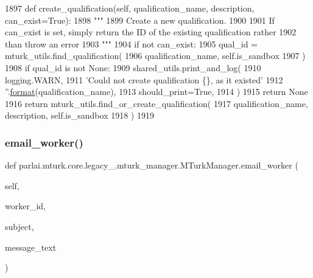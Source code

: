 \begin{DoxyCode}
1897     \textcolor{keyword}{def }create\_qualification(self, qualification\_name, description, can\_exist=True):
1898         \textcolor{stringliteral}{"""}
1899 \textcolor{stringliteral}{        Create a new qualification.}
1900 \textcolor{stringliteral}{}
1901 \textcolor{stringliteral}{        If can\_exist is set, simply return the ID of the existing qualification rather}
1902 \textcolor{stringliteral}{        than throw an error}
1903 \textcolor{stringliteral}{        """}
1904         \textcolor{keywordflow}{if} \textcolor{keywordflow}{not} can\_exist:
1905             qual\_id = mturk\_utils.find\_qualification(
1906                 qualification\_name, self.is\_sandbox
1907             )
1908             \textcolor{keywordflow}{if} qual\_id \textcolor{keywordflow}{is} \textcolor{keywordflow}{not} \textcolor{keywordtype}{None}:
1909                 shared\_utils.print\_and\_log(
1910                     logging.WARN,
1911                     \textcolor{stringliteral}{'Could not create qualification \{\}, as it existed'}
1912                     \textcolor{stringliteral}{''}.\hyperlink{namespaceparlai_1_1chat__service_1_1services_1_1messenger_1_1shared__utils_a32e2e2022b824fbaf80c747160b52a76}{format}(qualification\_name),
1913                     should\_print=\textcolor{keyword}{True},
1914                 )
1915                 \textcolor{keywordflow}{return} \textcolor{keywordtype}{None}
1916         \textcolor{keywordflow}{return} mturk\_utils.find\_or\_create\_qualification(
1917             qualification\_name, description, self.is\_sandbox
1918         )
1919 
\end{DoxyCode}
\mbox{\label{classparlai_1_1mturk_1_1core_1_1legacy__2018_1_1mturk__manager_1_1MTurkManager_af1f80f4a287a64eb89196fdcd1363f97}} 
\subsubsection{\texorpdfstring{email\+\_\+worker()}{email\_worker()}}
{\footnotesize\ttfamily def parlai.\+mturk.\+core.\+legacy\+\_.\+mturk\+\_\+manager.\+M\+Turk\+Manager.\+email\+\_\+worker (\begin{DoxyParamCaption}\item[{}]{self,  }\item[{}]{worker\+\_\+id,  }\item[{}]{subject,  }\item[{}]{message\+\_\+text }\end{DoxyParamCaption})}

